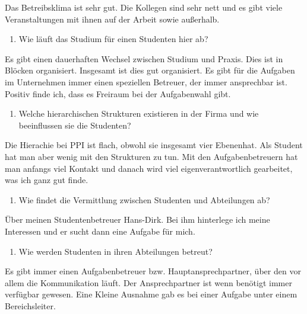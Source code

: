 \documentclass[
  12pt,
  ngerman,
  a4paper,
]{article}
\providecommand{\tightlist}{%
  \setlength{\itemsep}{0pt}\setlength{\parskip}{0pt}}
\begin{document}
Das Betreibsklima ist sehr gut. Die Kollegen sind sehr nett und es gibt
viele Veranstaltungen mit ihnen auf der Arbeit sowie außerhalb.

\begin{enumerate}
\def\labelenumi{\arabic{enumi}.}
\setcounter{enumi}{2}
\tightlist
\item
  Wie läuft das Studium für einen Studenten hier ab?
\end{enumerate}

Es gibt einen dauerhaften Wechsel zwischen Studium und Praxis. Dies ist
in Blöcken organisiert. Insgesamt ist dies gut organisiert. Es gibt für
die Aufgaben im Unternehmen immer einen speziellen Betreuer, der immer
ansprechbar ist. Positiv finde ich, dass es Freiraum bei der
Aufgabenwahl gibt.

\begin{enumerate}
\def\labelenumi{\arabic{enumi}.}
\setcounter{enumi}{3}
\tightlist
\item
  Welche hierarchischen Strukturen existieren in der Firma und wie
  beeinflussen sie die Studenten?
\end{enumerate}

Die Hierachie bei PPI ist flach, obwohl sie insgesamt vier Ebenenhat.
Als Student hat man aber wenig mit den Strukturen zu tun. Mit den
Aufgabenbetreuern hat man anfangs viel Kontakt und danach wird viel
eigenverantwortlich gearbeitet, was ich ganz gut finde.

\begin{enumerate}
\def\labelenumi{\arabic{enumi}.}
\setcounter{enumi}{4}
\tightlist
\item
  Wie findet die Vermittlung zwischen Studenten und Abteilungen ab?
\end{enumerate}

Über meinen Studentenbetreuer Hans-Dirk. Bei ihm hinterlege ich meine
Interessen und er sucht dann eine Aufgabe für mich.

\begin{enumerate}
\def\labelenumi{\arabic{enumi}.}
\setcounter{enumi}{5}
\tightlist
\item
  Wie werden Studenten in ihren Abteilungen betreut?
\end{enumerate}

Es gibt immer einen Aufgabenbetreuer bzw. Hauptansprechpartner, über den
vor allem die Kommunikation läuft. Der Ansprechpartner ist wenn benötigt
immer verfügbar gewesen. Eine Kleine Ausnahme gab es bei einer Aufgabe
unter einem Bereichsleiter.
\end{document}
